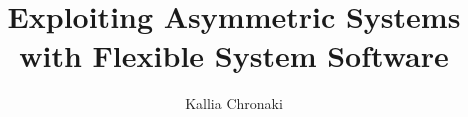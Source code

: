 \title{Exploiting Asymmetric Systems with Flexible System Software}


\author{Kallia Chronaki}



\renewcommand{\submissiontext}{This dissertation is submitted for the degree of}





